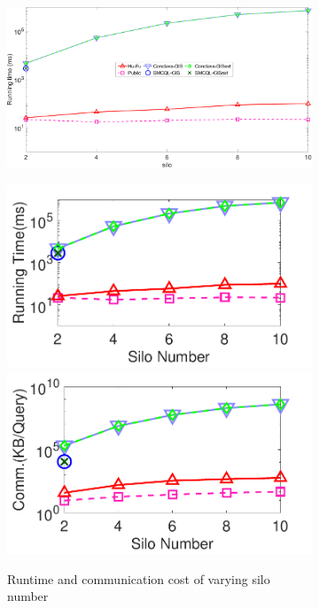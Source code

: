 
\begin{figure}[t]
    \centering
    \begin{subfigure}{0.30\textwidth}
        \centering
        \includegraphics[width=\textwidth]{legend.pdf}
    \end{subfigure}
    \begin{subfigure}{0.48\textwidth}
        \centering
        \includegraphics[width=0.48\linewidth]{knn_silo_time.pdf}
        \includegraphics[width=0.48\linewidth]{knn_silo_cost.pdf}
        \caption{Runtime and communication cost of varying silo number}
        \label{fig:knn-eff-silo}
    \end{subfigure}
    \begin{subfigure}{0.48\textwidth}
        \centering

\end{subfigure}
\end{figure}
